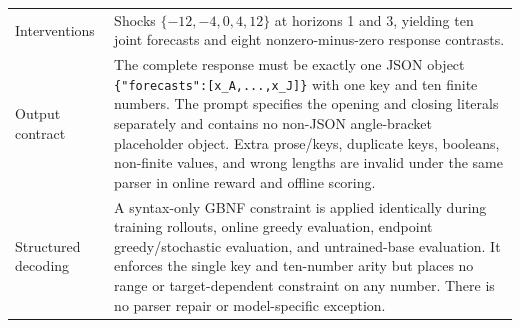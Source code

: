 \begin{center}
\begin{minipage}{\linewidth}
\begin{tabular}{p{.29\linewidth}p{.66\linewidth}}
Interventions & Shocks $\{-12,-4,0,4,12\}$ at horizons 1 and 3, yielding ten joint
forecasts and eight nonzero-minus-zero response contrasts. \\
Output contract & The complete response must be exactly one JSON object
\texttt{\{"forecasts":[x\_A,...,x\_J]\}} with one key and ten finite numbers.
The prompt specifies the opening and closing literals separately and contains no non-JSON
angle-bracket placeholder object.
Extra prose/keys, duplicate keys, booleans, non-finite values, and wrong lengths are
invalid under the same parser in online reward and offline scoring. \\
Structured decoding & A syntax-only GBNF constraint is applied identically during
training rollouts, online greedy evaluation, endpoint greedy/stochastic evaluation,
and untrained-base evaluation. It enforces the single key and ten-number arity but
places no range or target-dependent constraint on any number. There is no parser repair
or model-specific exception. \\
\bottomrule
\end{tabular}
\end{minipage}
\end{center}

